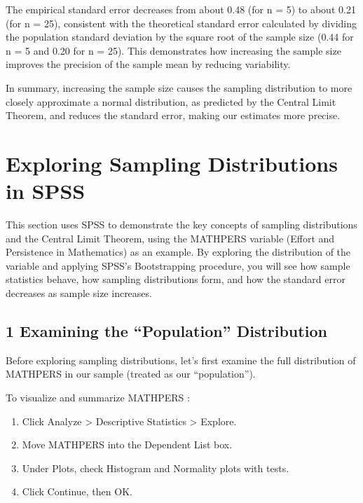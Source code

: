 \documentclass[
  letterpaper,
  DIV=11,
  numbers=noendperiod]{scrreprt}
\begin{document}
The empirical standard error decreases from about 0.48 (for n = 5) to
about 0.21 (for n = 25), consistent with the theoretical standard error
calculated by dividing the population standard deviation by the square
root of the sample size (0.44 for n = 5 and 0.20 for n = 25). This
demonstrates how increasing the sample size improves the precision of
the sample mean by reducing variability.

In summary, increasing the sample size causes the sampling distribution
to more closely approximate a normal distribution, as predicted by the
Central Limit Theorem, and reduces the standard error, making our
estimates more precise.


\chapter*{Exploring Sampling Distributions in
SPSS}\label{exploring-sampling-distributions-in-spss}


This section uses SPSS to demonstrate the key concepts of sampling
distributions and the Central Limit Theorem, using the MATHPERS variable
(Effort and Persistence in Mathematics) as an example. By exploring the
distribution of the variable and applying SPSS's Bootstrapping
procedure, you will see how sample statistics behave, how sampling
distributions form, and how the standard error decreases as sample size
increases.

\section*{1 Examining the ``Population''
Distribution}\label{examining-the-population-distribution-1}


Before exploring sampling distributions, let's first examine the full
distribution of MATHPERS in our sample (treated as our ``population'').

To visualize and summarize MATHPERS :

\begin{enumerate}
\def\labelenumi{\arabic{enumi}.}
\item
  Click Analyze \textgreater{} Descriptive Statistics \textgreater{}
  Explore.
\item
  Move MATHPERS into the Dependent List box.
\item
  Under Plots, check Histogram and Normality plots with tests.
\item
  Click Continue, then OK.
\end{enumerate}
\end{document}
